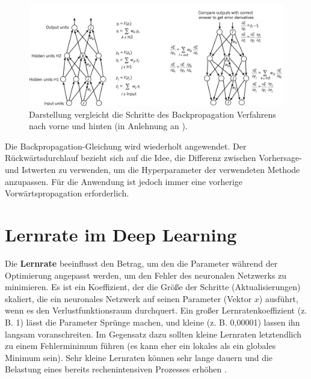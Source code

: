         \begin{figure}[H]
            \centering
            \includegraphics[width=13cm]{kapitel2/backprop.png}
            \caption[Die Vorwärts- und Rückwärtsschritte im Backpropagation]{Darstellung vergleicht die Schritte des Backpropagation Verfahrens nach vorne und hinten (in Anlehnung an \cite*{Lecun2015}).}
            \label{BackProp}
        \end{figure}

        Die Backpropagation-Gleichung wird wiederholt angewendet. Der Rückwärtsdurchlauf bezieht sich auf die Idee, die Differenz zwischen Vorhersage- und Istwerten zu verwenden, um die Hyperparameter der verwendeten Methode anzupassen. Für die Anwendung ist jedoch immer eine vorherige Vorwärtspropagation erforderlich.


        \section{Lernrate im Deep Learning}
        Die \textbf{Lernrate} beeinflusst den Betrag, um den die Parameter während der Optimierung angepasst werden, um den Fehler des neuronalen Netzwerks zu minimieren. Es ist ein Koeffizient, der die Größe der Schritte (Aktualisierungen) skaliert, die ein neuronales Netzwerk auf seinen Parameter (Vektor $x$) ausführt, wenn es den Verlustfunktionsraum durchquert. Ein großer Lernratenkoeffizient (z. B. 1) lässt die Parameter Sprünge machen, und kleine (z. B. 0,00001) lassen ihn langsam voranschreiten. Im Gegensatz dazu sollten kleine Lernraten letztendlich zu einem Fehlerminimum führen (es kann eher ein lokales als ein globales Minimum sein). Sehr kleine Lernraten können sehr lange dauern und die Belastung eines bereits rechenintensiven Prozesses erhöhen  \cite*[77]{Patterson2019}.


